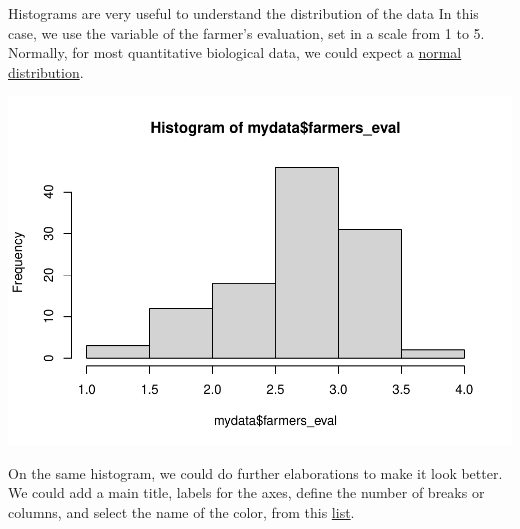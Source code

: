 \documentclass[
]{book}
\newenvironment{Shaded}{\begin{snugshade}}{\end{snugshade}}
\newcommand{\AttributeTok}[1]{\textcolor[rgb]{0.77,0.63,0.00}{#1}}
\newcommand{\CommentTok}[1]{\textcolor[rgb]{0.56,0.35,0.01}{\textit{#1}}}
\newcommand{\DecValTok}[1]{\textcolor[rgb]{0.00,0.00,0.81}{#1}}
\newcommand{\FunctionTok}[1]{\textcolor[rgb]{0.00,0.00,0.00}{#1}}
\newcommand{\NormalTok}[1]{#1}
\newcommand{\SpecialCharTok}[1]{\textcolor[rgb]{0.00,0.00,0.00}{#1}}
\newcommand{\StringTok}[1]{\textcolor[rgb]{0.31,0.60,0.02}{#1}}
\begin{document}
Histograms are very useful to understand the distribution of the data In this case, we use the variable of the farmer's evaluation, set in a scale from 1 to 5. Normally, for most quantitative biological data, we could expect a \href{https://en.wikipedia.org/wiki/Normal_distribution}{normal distribution}.

\begin{Shaded}
\end{Shaded}

\includegraphics{PPB-Toolkit-for-R-and-R-Studio_files/figure-latex/unnamed-chunk-52-1.pdf}

On the same histogram, we could do further elaborations to make it look better. We could add a main title, labels for the axes, define the number of breaks or columns, and select the name of the color, from this \href{http://www.stat.columbia.edu/~tzheng/files/Rcolor.pdf}{list}.

\begin{Shaded}
\end{Shaded}
\end{document}
